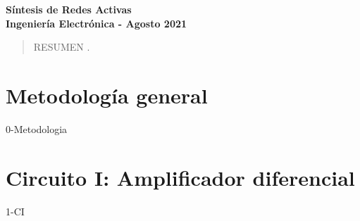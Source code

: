 \documentclass{article}
\author{
\large
\textsc{\textbf{Alumno:} Juan Perez 30.000.000 JP@gmail.com}\\
-\\
\textsc{\textbf{Profesor Titular:} Dr. Ing. Pablo Ferreyra}\\
\textsc{\textbf{Profesor Adjunto:} Ing. César Reale} \\
\textsc{\textbf{Profesor Ayudate:} Ing. Daniel Sánchez} \\
\textsc{\textbf{Ayudante alumno:} Lucas Heraldo Duarte} \\
\normalsize Facultad de Ciencias Exactas Físicas y Naturales \\ Universidad Nacional de Córdoba  %
\vspace{-5mm}
}
\begin{document}
\maketitle

\begin{center}

\textbf{Síntesis de Redes Activas}\\

\textbf{Ingeniería Electrónica - Agosto 2021}\\

\end{center}

\thispagestyle{fancy}


 \begin{abstract}

 \noindent RESUMEN .

 \end{abstract}

\section{Metodología general}
{0-Metodologia}

\newpage{}
\section{Circuito I: Amplificador diferencial}
{1-CI}
\end{document}

